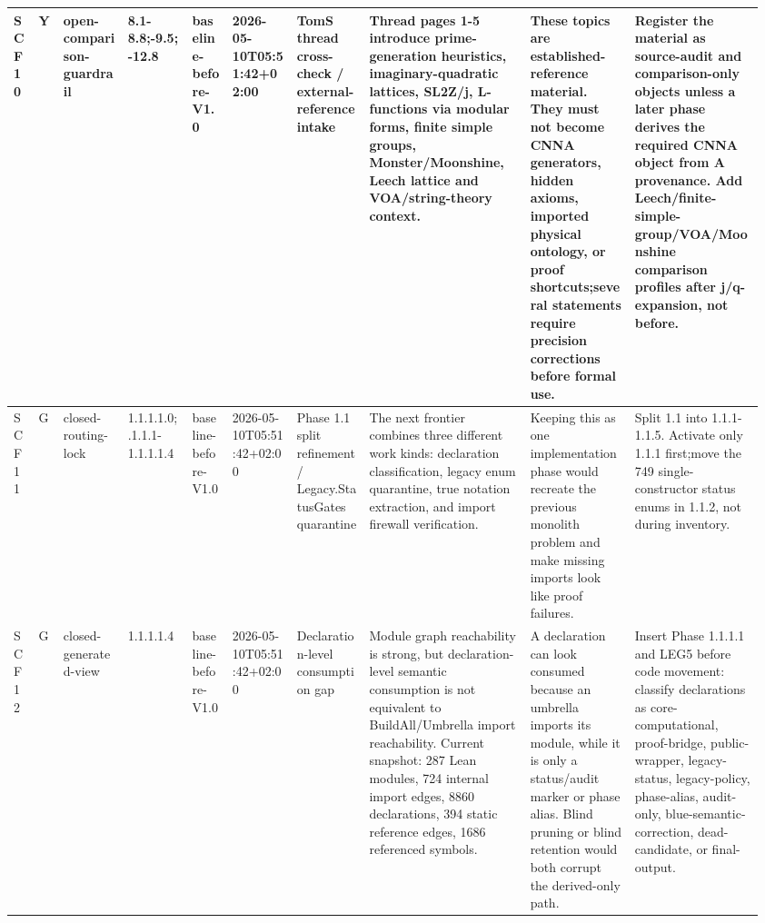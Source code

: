 \begin{longtable}{L{0.03\linewidth} L{0.026\linewidth} L{0.087\linewidth} L{0.085\linewidth} L{0.052\linewidth} L{0.085\linewidth} L{0.095\linewidth} L{0.205\linewidth} L{0.13\linewidth} L{0.165\linewidth}}
SCF10 & Y & open-comparison-guardrail & 8.1-8.8;-9.5;-12.8 & baseline-before-V1.0 & 2026-05-10T05:51:42+02:00 & TomS thread cross-check /\allowbreak{} external-reference intake & Thread pages 1-5 introduce prime-generation heuristics, imaginary-quadratic lattices, SL2Z/\allowbreak{}j, L-functions via modular forms, finite simple groups, Monster/\allowbreak{}Moonshine, Leech lattice and VOA/\allowbreak{}string-theory context. & These topics are established-reference material. They must not become CNNA generators, hidden axioms, imported physical ontology, or proof shortcuts;\newline several statements require precision corrections before formal use. & Register the material as source-audit and comparison-only objects unless a later phase derives the required CNNA object from A provenance. Add Leech/\allowbreak{}finite-simple-group/\allowbreak{}VOA/\allowbreak{}Moonshine comparison profiles after j/\allowbreak{}q-expansion, not before.\\
\hline
\addlinespace[0.24em]
SCF11 & G & closed-routing-lock & 1.1.1.1.0;.1.1.1-1.1.1.1.4 & baseline-before-V1.0 & 2026-05-10T05:51:42+02:00 & Phase 1.1 split refinement /\allowbreak{} Legacy.StatusGates quarantine & The next frontier combines three different work kinds: declaration classification, legacy enum quarantine, true notation extraction, and import firewall verification. & Keeping this as one implementation phase would recreate the previous monolith problem and make missing imports look like proof failures. & Split 1.1 into 1.1.1-1.1.5. Activate only 1.1.1 first;\newline move the 749 single-constructor status enums in 1.1.2, not during inventory.\\
\hline
\addlinespace[0.24em]
SCF12 & G & closed-generated-view & 1.1.1.1.4 & baseline-before-V1.0 & 2026-05-10T05:51:42+02:00 & Declaration-level consumption gap & Module graph reachability is strong, but declaration-level semantic consumption is not equivalent to BuildAll/\allowbreak{}Umbrella import reachability. Current snapshot: 287 Lean modules, 724 internal import edges, 8860 declarations, 394 static reference edges, 1686 referenced symbols. & A declaration can look consumed because an umbrella imports its module, while it is only a status/\allowbreak{}audit marker or phase alias. Blind pruning or blind retention would both corrupt the derived-only path. & Insert Phase 1.1.1.1 and LEG5 before code movement: classify declarations as core-computational, proof-bridge, public-wrapper, legacy-status, legacy-policy, phase-alias, audit-only, blue-semantic-correction, dead-candidate, or final-output.\\

\end{longtable}
